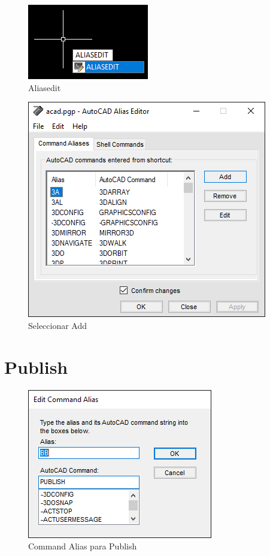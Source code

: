 \documentclass{report}
\begin{document}
\begin{figure}[H]
	\centering
	\includegraphics[width=0.65\linewidth, height=0.5\textheight,keepaspectratio]{Imagenes/autocad_alias_01}
	\caption{Aliasedit}
	\label{fig:autocadalias01}
\end{figure}

\begin{figure}[H]
	\centering
	\includegraphics[width=0.75\linewidth, height=0.5\textheight,keepaspectratio]{Imagenes/autocad_alias_02}
	\caption{Seleccionar Add}
	\label{fig:autocadalias02}
\end{figure}

\section{Publish}

\begin{figure}[H]
	\centering
	\includegraphics[width=0.75\linewidth, height=0.5\textheight,keepaspectratio]{Imagenes/autocad_alias_publish_01}
	\caption{Command Alias para Publish}
	\label{fig:autocadaliaspublish01}
\end{figure}
\end{document}
